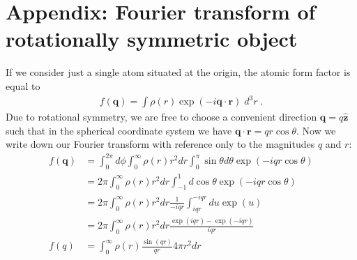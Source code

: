 \documentclass[12pt]{article}
\renewcommand{\vec}[1]{\boldsymbol{#1}}
\newcommand{\hvec}[1]{\hat{\vec{#1}}}
\begin{document}
\newpage
\section{Appendix: Fourier transform of rotationally symmetric object}
\label{sec:3d1d}

If we consider just a single atom situated at the origin, the atomic form factor 
is equal to
\begin{align}
 f(\vec{q})  = \int \rho(r) \exp(-i \vec{q}\cdot\vec{r}) \; d^3r \; .
\end{align}
Due to rotational symmetry, we are free to choose a convenient direction 
$\vec{q} = q \hvec{z}$ such that in the
spherical coordinate system we have $\vec{q}\cdot\vec{r} =  q r \cos\theta$.  
Now we write down our Fourier transform with
reference only to the magnitudes $q$ and $r$:
\begin{align}
f(\vec{q})  &= \int_0^{2\pi} d\phi \int_0^\infty \rho(r) r^2 dr \int_0^\pi 
\sin\theta d\theta  \exp(-i q r \cos\theta)\\
&=2\pi \int_0^\infty \rho(r) r^2 dr \int_{-1}^1  d\cos\theta  \exp(-i q r 
\cos\theta)  \\
&=2\pi \int_0^\infty \rho(r) r^2 dr \frac{1}{-iqr}\int_{iqr}^{-iqr}  du  \exp(u) 
 \\
&=2\pi \int_0^\infty \rho(r) r^2 dr \frac{\exp(iqr) - \exp(-iqr)}{iqr}   \\
f(q) &= \int_0^\infty \rho(r)   \frac{\sin(qr)}{qr}  4\pi r^2 dr  
\end{align}



\end{document}
